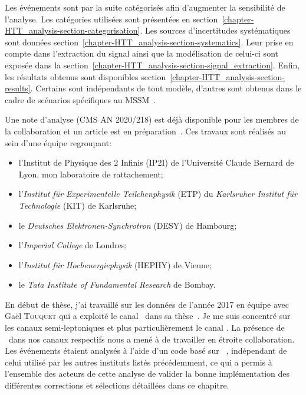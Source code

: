Les événements sont par la suite catégorisés afin d'augmenter la sensibilité de l'analyse.
Les catégories utilisées sont présentées en section~\ref{chapter-HTT_analysis-section-categorisation}.
Les sources d'incertitudes systématiques sont données section~\ref{chapter-HTT_analysis-section-systematics}.
Leur prise en compte dans l'extraction du signal ainsi que la modélisation de celui-ci sont exposée dans la section~\ref{chapter-HTT_analysis-section-signal_extraction}.
Enfin, les résultats obtenus sont disponibles section~\ref{chapter-HTT_analysis-section-results}.
Certains sont indépendants de tout modèle, d'autres sont obtenus dans le cadre de scénarios spécifiques au MSSM~\cite{Bagnaschi_2019}.
\par
Une note d'analyse (CMS AN 2020/218) \cite{CMS-NOTE-2020-218} est déjà disponible pour les membres de la collaboration et un article est en préparation~\cite{HIG-21-001}.
Ces travaux sont réalisés au sein d'une équipe regroupant:
\begin{itemize}
\item l'Institut de Physique des 2 Infinis (IP2I) de l'Université Claude Bernard de Lyon, mon laboratoire de rattachement;
\item l'\emph{Institut für Experimentelle Teilchenphysik} (ETP) du \emph{Karlsruher Institut für Technologie} (KIT) de Karlsruhe;
\item le \emph{Deutsches Elektronen-Synchrotron} (DESY) de Hambourg;
\item l'\emph{Imperial College} de Londres;
\item l'\emph{Institut für Hochenergiephysik} (HEPHY)
 de Vienne;
\item le \emph{Tata Institute of Fundamental Research} de Bombay.
\end{itemize}
\par
En début de thèse, j'ai travaillé sur les données de l'année 2017 en équipe avec Gaël \textsc{Touquet} qui a exploité le canal \tauh\tauh\ dans sa thèse~\cite{Gael_thesis}.
Je me suis concentré sur les  canaux semi-leptoniques et plus particulièrement le canal \mu\tauh.
La présence de \tauh\ dans nos canaux respectifs nous a mené à de travailler en étroite collaboration.
Les événements étaient analysés à l'aide d'un code basé sur \HEPPY~\cite{heppy},
indépendant de celui utilisé par les autres instituts listés précédemment,
ce qui a permis à l'ensemble des acteurs de cette analyse de valider la bonne implémentation des différentes corrections et sélections détaillées dans ce chapitre.
